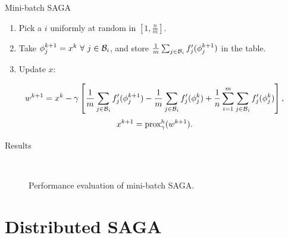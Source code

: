 \begin{frame}{Mini-batch SAGA}

\begin{enumerate}
\item Pick a $i$ uniformly at random in $[1, \frac{n}m]$.
\item Take $\phi_j^{k+1} = x^k \ \forall \ j \in \mathcal{B}_i$, and store $\frac1m
	\sum_{j\in\mathcal{B}_i} f_j'(\phi_j^{k+1})$ in the table.
\item Update $x$:
\end{enumerate}

	\begin{equation*}
	w^{k+1} = x^k - \gamma \left[ \frac1m \sum_{j\in\mathcal{B}_i} f_j'(\phi_j^{k+1})
	- \frac1m \sum_{j\in\mathcal{B}_i} f_j'(\phi_j^k)
	+ \frac1n \sum_{i=1}^m \sum_{j\in\mathcal{B}_i} f_j'(\phi_j^k) \right] ,
	\end{equation*}
	$$x^{k+1} = \textrm{prox}_\gamma^h (w^{k+1}).$$

\end{frame}

\begin{frame}{Results}

\begin{figure}[ht]
	\centering
	\hspace{0pt}
	\\
	\caption{Performance evaluation of mini-batch SAGA.}
	\label{eval_saga_mb}
\end{figure}

\end{frame}

\section{Distributed SAGA}

